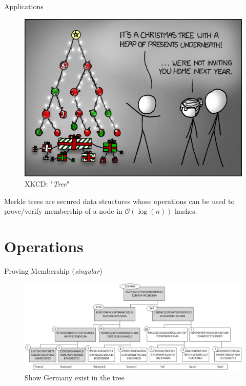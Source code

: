 \documentclass{beamer}
\begin{document}
\begin{frame}{Applications}
	\begin{multicols}{2}
		\begin{figure}
			\includegraphics[width=.45\textwidth]{../Images/xkcd-tree.png}
			\caption{XKCD: "\textit{Tree}" \cite{xkcd-tree}}
		\end{figure}
		
		\columnbreak
		
		\null \vfill
		
		Merkle trees are secured data structures whose operations can be used to prove/verify membership of a node in $\mathcal{O}(\log(n))$ hashes.
		
		\vfill \null
	\end{multicols}
\end{frame}


\section{Operations}

\begin{frame}{Proving Membership (\textit{singular})}
	
	\begin{figure}
		\includegraphics[width=.8\textwidth]{../Images/merkle-example.png}
		\caption{Show Germany exist in the tree \cite{buchannen_2022}}
		
	\end{figure}
\end{frame}
\end{document}
